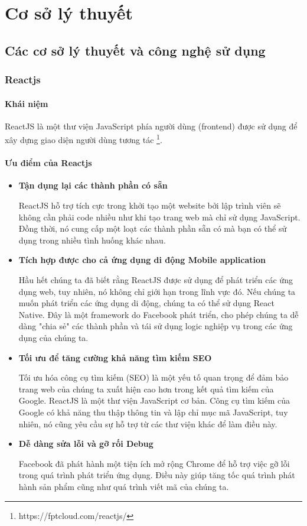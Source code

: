 \chapter{Cơ sở lý thuyết}
\section{Các cơ sở lý thuyết và công nghệ sử dụng}
\subsection{Reactjs}
\subsubsection{Khái niệm}
\noindent ReactJS là một thư viện JavaScript phía người dùng (frontend) được sử dụng để xây dựng giao diện người dùng tương tác \footnote{https://fptcloud.com/reactjs/}.
\subsubsection{Ưu điểm của Reactjs}
\begin{itemize}
    \item \textbf{Tận dụng lại các thành phần có sẵn}

    \indent ReactJS hỗ trợ tích cực trong khởi tạo một website bởi lập trình viên sẽ không cần phải code nhiều như khi tạo trang web mà chỉ sử dụng JavaScript. Đồng thời, nó cung cấp một loạt các thành phần sẵn có mà bạn có thể sử dụng trong nhiều tình huống khác nhau.
    \item \textbf{Tích hợp được cho cả ứng dụng di động Mobile application}

    \indent Hầu hết chúng ta đã biết rằng ReactJS được sử dụng để phát triển các ứng dụng web, tuy nhiên, nó không chỉ giới hạn trong lĩnh vực đó. Nếu chúng ta muốn phát triển các ứng dụng di động, chúng ta có thể sử dụng React Native. Đây là một framework do Facebook phát triển, cho phép chúng ta dễ dàng "chia sẻ" các thành phần và tái sử dụng logic nghiệp vụ trong các ứng dụng của chúng ta.
    \item \textbf{Tối ưu để tăng cường khả năng tìm kiếm SEO}

    \indent Tối ưu hóa công cụ tìm kiếm (SEO) là một yếu tố quan trọng để đảm bảo trang web của chúng ta xuất hiện cao hơn trong kết quả tìm kiếm của Google. ReactJS là một thư viện JavaScript cơ bản. Công cụ tìm kiếm của Google có khả năng thu thập thông tin và lập chỉ mục mã JavaScript, tuy nhiên, nó cũng yêu cầu sự hỗ trợ từ các thư viện khác để làm điều này.
    \item \textbf{Dễ dàng sửa lỗi và gỡ rối Debug}

    \indent Facebook đã phát hành một tiện ích mở rộng Chrome để hỗ trợ việc gỡ lỗi trong quá trình phát triển ứng dụng. Điều này giúp tăng tốc quá trình phát hành sản phẩm cũng như quá trình viết mã của chúng ta.
\end{itemize}
